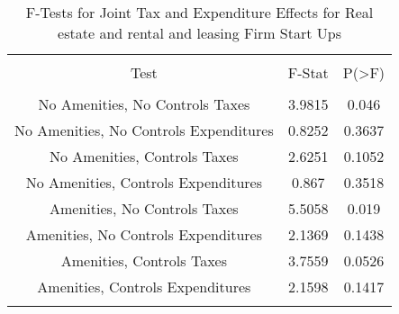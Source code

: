 
\begin{table}[!htbp] \centering 
  \caption{F-Tests for Joint Tax and Expenditure Effects for Real estate and rental and leasing Firm Start Ups} 
  \label{53Ftests} 
\begin{tabular}{@{\extracolsep{5pt}} ccc} 
\\[-1.8ex]\hline 
\hline \\[-1.8ex] 
Test & F-Stat & P(\textgreater F) \\ 
\hline \\[-1.8ex] 
No Amenities, No Controls Taxes & 3.9815 & 0.046 \\ 
No Amenities, No Controls Expenditures & 0.8252 & 0.3637 \\ 
No Amenities, Controls Taxes & 2.6251 & 0.1052 \\ 
No Amenities, Controls Expenditures & 0.867 & 0.3518 \\ 
Amenities, No Controls Taxes & 5.5058 & 0.019 \\ 
Amenities, No Controls Expenditures & 2.1369 & 0.1438 \\ 
Amenities, Controls Taxes & 3.7559 & 0.0526 \\ 
Amenities, Controls Expenditures & 2.1598 & 0.1417 \\ 
\hline \\[-1.8ex] 
\end{tabular} 
\end{table} 
